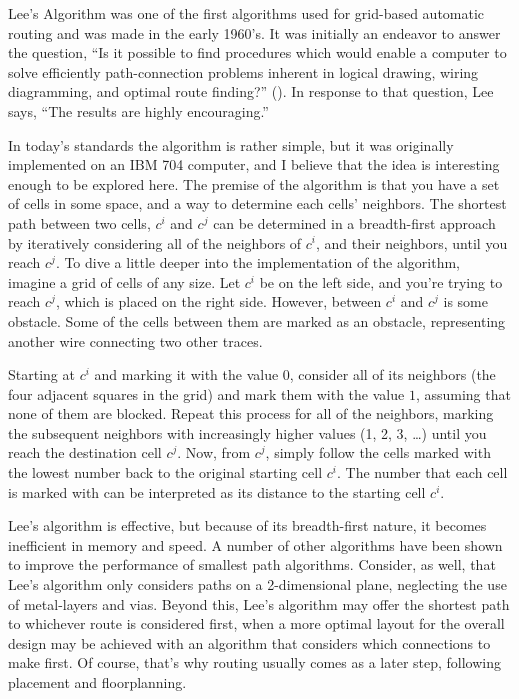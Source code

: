 
Lee's Algorithm was one of the first algorithms used
for grid-based automatic routing and was made in the
early 1960's. It was initially an endeavor to answer
the question, ``Is it possible to find procedures which
would enable a computer to solve efficiently path-connection
problems inherent in logical drawing, wiring diagramming,
and optimal route finding?'' (\cite{5219222}). In response
to that question, Lee says, ``The results are highly
encouraging.''

In today's standards the algorithm is rather simple,
but it was originally implemented on an IBM 704 computer,
and I believe that the idea is interesting enough to
be explored here. The premise of the algorithm is that
you have a set of cells in some space, and a way to
determine each cells' neighbors. The shortest path between
two cells, $c^i$ and $c^j$ can be determined in a breadth-first
approach by iteratively considering all of the neighbors
of $c^i$, and their neighbors, until you reach $c^j$.
To dive a little deeper into the implementation of the
algorithm, imagine a grid of cells of any size. Let
$c^i$ be on the left side, and you're trying to reach
$c^j$, which is placed on the right side. However, between
$c^i$ and $c^j$ is some obstacle. Some of the cells
between them are marked as an obstacle, representing
another wire connecting two other traces.

Starting at $c^i$ and marking it with the value $0$,
consider all of its neighbors (the four adjacent squares
in the grid) and mark them with the value $1$, assuming
that none of them are blocked. Repeat this process for
all of the neighbors, marking the subsequent neighbors
with increasingly higher values (1, 2, 3, \dots) until
you reach the destination cell $c^j$. Now, from $c^j$, simply
follow the cells marked with the lowest number
back to the original starting cell $c^i$. The number
that each cell is marked with can be interpreted as its distance
to the starting cell $c^i$.

Lee's algorithm is effective, but because of its breadth-first
nature, it becomes inefficient in memory and speed.
A number of other algorithms have been shown to improve
the performance of smallest path algorithms. Consider,
as well, that Lee's algorithm only considers paths on
a 2-dimensional plane, neglecting the use of metal-layers
and vias. Beyond this, Lee's algorithm may offer the
shortest path to whichever route is considered first,
when a more optimal layout for the overall design may
be achieved with an algorithm that considers which connections
to make first. Of course, that's why routing usually comes
as a later step, following placement and floorplanning.
